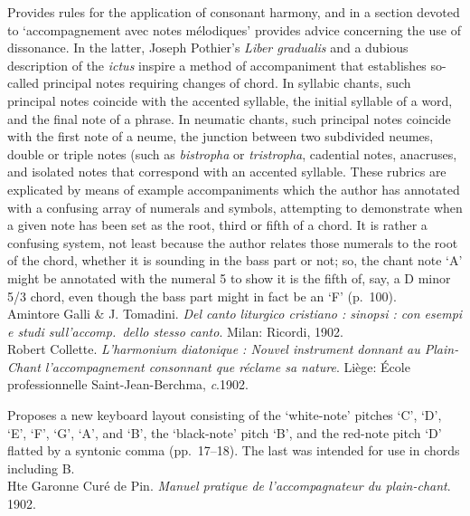      \parindent=20pt
     \hangindent=20pt
     Provides rules for the application of consonant harmony, and in a section devoted to `accompagnement avec notes mélodiques' provides advice concerning the use of dissonance. In the latter, Joseph Pothier's \emph{Liber gradualis} and a dubious description of the \emph{ictus} inspire a method of accompaniment that establishes so-called principal notes requiring changes of chord. In syllabic chants, such principal notes coincide with the accented syllable, the initial syllable of a word, and the final note of a phrase. In neumatic chants, such principal notes coincide with the first note of a neume, the junction between two subdivided neumes, double or triple notes (such as \emph{bistropha} or \emph{tristropha}, cadential notes, anacruses, and isolated notes that correspond with an accented syllable. These rubrics are explicated by means of example accompaniments which the author has annotated with a confusing array of numerals and symbols, attempting to demonstrate when a given note has been set as the root, third or fifth of a chord. It is rather a confusing system, not least because the author relates those numerals to the root of the chord, whether it is sounding in the bass part or not; so, the chant note `A' might be annotated with the numeral 5 to show it is the fifth of, say, a D minor 5/3 chord, even though the bass part might in fact be an `F' (p.~100).\\

    \parindent=0pt
    \hangindent=0pt
  \covid{}Amintore Galli \& J. Tomadini. \emph{Del canto liturgico cristiano : sinopsi : con esempi e studi sull'accomp.\ dello stesso canto}. Milan:  Ricordi, 1902. \\

    \parindent=0pt
    \hangindent=0pt
  Robert Collette. \emph{L'harmonium diatonique : Nouvel instrument donnant au Plain-Chant l'accompagnement consonnant que réclame sa nature}. Liège:  École professionnelle Saint-Jean-Berchma, \emph{c}.1902.

     \parindent=20pt
     \hangindent=20pt
     Proposes a new keyboard layout consisting of the `white-note' pitches `C', `D', `E', `F', `G', `A', and `B', the `black-note' pitch `B'\kern 1pt\flat{}, and the red-note pitch `D' flatted by a syntonic comma (pp.~17--18). The last was intended for use in chords including B\kern 1pt\flat{}.\\

    \parindent=0pt
    \hangindent=0pt
  \covid{}Hte Garonne Curé de Pin. \emph{Manuel pratique de l'accompagnateur du plain-chant}. 1902. \\


